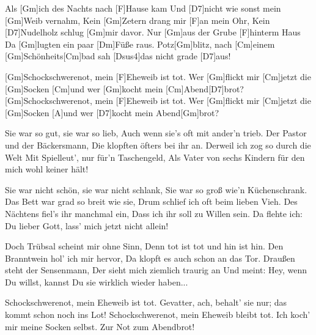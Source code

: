 

\begin{guitar}
	Als [Gm]ich des Nachts nach [F]Hause kam 
	Und [D7]nicht wie sonst mein [Gm]Weib vernahm,
	Kein [Gm]Zetern drang mir [F]an mein Ohr,
	Kein [D7]Nudelholz schlug [Gm]mir davor.
	Nur [Gm]aus der Grube [F]hinterm Haus
	Da [Gm]lugten ein paar [Dm]Füße raus.
	Potz[Gm]blitz, nach [Cm]einem [Gm]Schönheits[Cm]bad sah [Dsus4]das nicht grade [D7]aus!
	
	[Gm]Schockschwerenot, mein [F]Eheweib ist tot.
	Wer [Gm]flickt mir [Cm]jetzt die [Gm]Socken [Cm]und wer [Gm]kocht mein [Cm]Abend[D7]brot?
	[Gm]Schockschwerenot, mein [F]Eheweib ist tot.
	Wer [Gm]flickt mir [Cm]jetzt die [Gm]Socken [A]und wer [D7]kocht mein Abend[Gm]brot?
	
	Sie war so gut, sie war so lieb,
	Auch wenn sie's oft mit ander'n trieb.
	Der Pastor und der Bäckersmann,
	Die klopften öfters bei ihr an.
	Derweil ich zog so durch die Welt
	Mit Spielleut', nur für'n Taschengeld,
	Als Vater von sechs Kindern für den mich wohl keiner hält!
	
	 
	
	Sie war nicht schön, sie war nicht schlank,
	Sie war so groß wie'n Küchenschrank.
	Das Bett war grad so breit wie sie,
	Drum schlief ich oft beim lieben Vieh.
	Des Nächtens fiel's ihr manchmal ein,
	Dass ich ihr soll zu Willen sein.
	Da flehte ich: Du lieber Gott, lass' mich jetzt nicht allein!
	
	 
	
	Doch Trübsal scheint mir ohne Sinn,
	Denn tot ist tot und hin ist hin.
	Den Branntwein hol' ich mir hervor,
	Da klopft es auch schon an das Tor.
	Draußen steht der Sensenmann,
	Der sieht mich ziemlich traurig an
	Und meint: Hey, wenn Du willst, kannst Du sie wirklich wieder haben...
	
	Schockschwerenot, mein Eheweib ist tot.
	Gevatter, ach, behalt' sie nur; das kommt schon noch ins Lot!
	Schockschwerenot, mein Eheweib bleibt tot.
	Ich koch' mir meine Socken selbst. Zur Not zum Abendbrot!
\end{guitar}